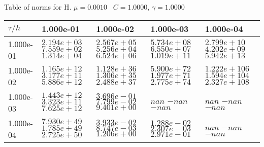 \begin{center}
Table of norms for H. $\mu = 0.0010$ \, $C = 1.0000$, $\gamma = 1.0000$
  
\begin{tabular}{|p{1in}|p{1in}|p{1in}|p{1in}|p{1in}|} \hline
$\tau / h$ &1.000e-01 &1.000e-02 &1.000e-03 &1.000e-04 \\ \hline 
1.000e-01 & $2.194e+03$  $7.559e+02$  $1.314e+04$  & $2.567e+05$  $5.256e+04$  $6.524e+06$  & $5.734e+08$  $6.550e+07$  $1.019e+11$  & $2.799e+10$  $4.202e+09$  $5.942e+13$  \\ \hline 
1.000e-02 & $1.165e+12$  $3.177e+11$  $5.886e+12$  & $1.128e+36$  $1.306e+35$  $2.488e+37$  & $5.900e+72$  $1.977e+71$  $2.775e+74$  & $1.222e+106$  $1.594e+104$  $2.327e+108$  \\ \hline 
1.000e-03 & $1.443e+12$  $3.323e+11$  $7.625e+12$  & $3.696e-01$  $7.799e-02$  $9.401e+00$  & $nan$  $-nan$  $-nan$  & $nan$  $-nan$  $-nan$  \\ \hline 
1.000e-04 & $7.930e+49$  $1.785e+49$  $2.725e+50$  & $3.933e-02$  $8.747e-03$  $1.206e+00$  & $1.288e-02$  $2.307e-03$  $2.971e-01$  & $nan$  $-nan$  $-nan$  \\ \hline 

\end{tabular}\\[20pt]
\end{center}
